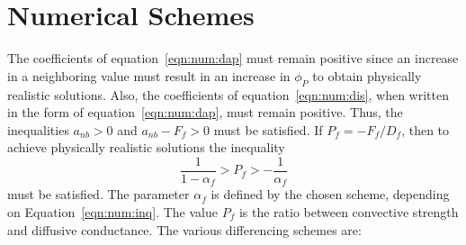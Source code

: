 \section{Numerical Schemes}

The coefficients of equation~\eqref{eqn:num:dap} must remain positive
since an increase in a neighboring value must result in an increase
in $\phi_P$ to obtain physically realistic solutions. Also, the
coefficients of equation~\eqref{eqn:num:dis}, when written in the form
of equation~\eqref{eqn:num:dap}, must remain positive. Thus, the
inequalities $a_{nb} > 0$ and $a_{nb} - F_f>0$ must be satisfied.  If
$P_f = -F_f / D_f$, then to achieve physically realistic solutions the
inequality
\begin{equation}
\frac{1}{1-\alpha_f} > P_f > -\frac{1}{\alpha_f}
\label{eqn:num:inq}
\end{equation}
must be satisfied.
The parameter $\alpha_f$ is defined by the chosen scheme, depending
on Equation~\eqref{eqn:num:inq}. The value $P_f$ is the ratio between
convective strength and diffusive conductance. The various
differencing schemes are:
